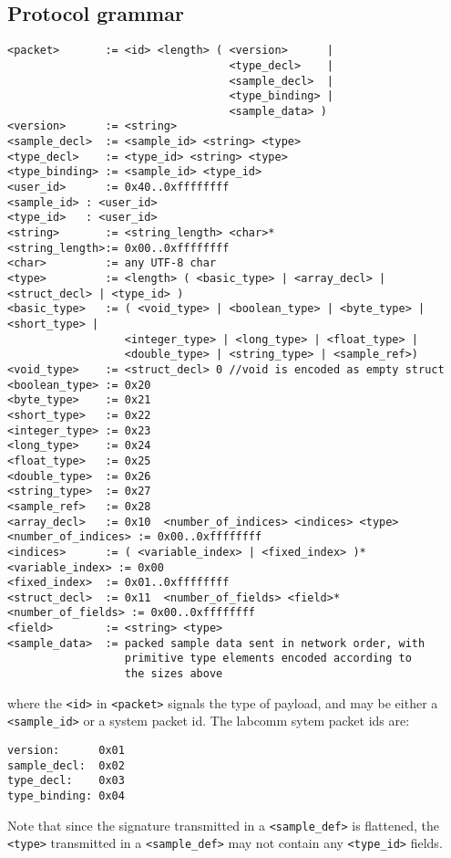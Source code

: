 \documentclass[a4paper]{article}
\begin{document}
\subsection{Protocol grammar}
\label{sec:ConcreteGrammar}
\begin{lstlisting}[basicstyle=\footnotesize\ttfamily]
<packet>       := <id> <length> ( <version>      | 
                                  <type_decl>    | 
                                  <sample_decl>  |
                                  <type_binding> |
                                  <sample_data> )
<version>      := <string>
<sample_decl>  := <sample_id> <string> <type>
<type_decl>    := <type_id> <string> <type>
<type_binding> := <sample_id> <type_id>
<user_id>      := 0x40..0xffffffff  
<sample_id> : <user_id>
<type_id>   : <user_id>
<string>       := <string_length> <char>*
<string_length>:= 0x00..0xffffffff  
<char>         := any UTF-8 char
<type>         := <length> ( <basic_type> | <array_decl> | <struct_decl> | <type_id> )
<basic_type>   := ( <void_type> | <boolean_type> | <byte_type> | <short_type> |
                  <integer_type> | <long_type> | <float_type> |
                  <double_type> | <string_type> | <sample_ref>)
<void_type>    := <struct_decl> 0 //void is encoded as empty struct
<boolean_type> := 0x20 
<byte_type>    := 0x21 
<short_type>   := 0x22 
<integer_type> := 0x23 
<long_type>    := 0x24 
<float_type>   := 0x25 
<double_type>  := 0x26 
<string_type>  := 0x27 
<sample_ref>   := 0x28 
<array_decl>   := 0x10  <number_of_indices> <indices> <type>
<number_of_indices> := 0x00..0xffffffff  
<indices>      := ( <variable_index> | <fixed_index> )*
<variable_index> := 0x00  
<fixed_index>  := 0x01..0xffffffff  
<struct_decl>  := 0x11  <number_of_fields> <field>*
<number_of_fields> := 0x00..0xffffffff  
<field>        := <string> <type>
<sample_data>  := packed sample data sent in network order, with
                  primitive type elements encoded according to
                  the sizes above
\end{lstlisting}
where the \verb+<id>+ in \verb+<packet>+ signals the type of payload,
and may be either a \verb+<sample_id>+ or a system packet id.
The labcomm sytem packet ids are:
\begin{lstlisting}[basicstyle=\footnotesize\ttfamily]
version:      0x01 
sample_decl:  0x02 
type_decl:    0x03 
type_binding: 0x04          
\end{lstlisting}
Note that since the signature transmitted in a \verb+<sample_def>+ is
flattened, the \verb+<type>+ transmitted in a \verb+<sample_def>+ may
not contain any \verb+<type_id>+ fields.
\end{document}
